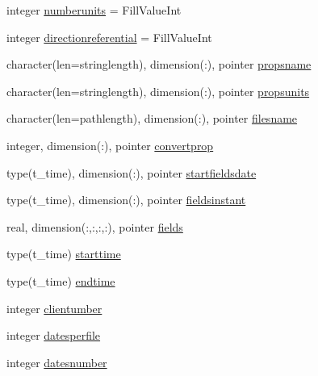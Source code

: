 \begin{DoxyCompactItemize}
\item 
integer \mbox{\hyperlink{structmodulegfsasciiwind_1_1t__gfsasciiwind_a647af2640607a85ca5ad4abdc1e829c6}{numberunits}} = Fill\+Value\+Int
\item 
integer \mbox{\hyperlink{structmodulegfsasciiwind_1_1t__gfsasciiwind_a1a4af61281f9aa8b72f4f747e35d1a46}{directionreferential}} = Fill\+Value\+Int
\item 
character(len=stringlength), dimension(\+:), pointer \mbox{\hyperlink{structmodulegfsasciiwind_1_1t__gfsasciiwind_a7d05c7a9057b2f370d8603bfcd718f51}{propsname}}
\item 
character(len=stringlength), dimension(\+:), pointer \mbox{\hyperlink{structmodulegfsasciiwind_1_1t__gfsasciiwind_a5761b1671bf051f52aaddc7c3b7463c3}{propsunits}}
\item 
character(len=pathlength), dimension(\+:), pointer \mbox{\hyperlink{structmodulegfsasciiwind_1_1t__gfsasciiwind_a4c88768c63596b6460b1382b7ef14d79}{filesname}}
\item 
integer, dimension(\+:), pointer \mbox{\hyperlink{structmodulegfsasciiwind_1_1t__gfsasciiwind_a14b1dcbd30dc506e93d917a67542ebd3}{convertprop}}
\item 
type(t\+\_\+time), dimension(\+:), pointer \mbox{\hyperlink{structmodulegfsasciiwind_1_1t__gfsasciiwind_a2eecde5054b0ade4965149f85bd6ed5e}{startfieldsdate}}
\item 
type(t\+\_\+time), dimension(\+:), pointer \mbox{\hyperlink{structmodulegfsasciiwind_1_1t__gfsasciiwind_ac61e5cee95a405d1c36ea100fc9e802e}{fieldsinstant}}
\item 
real, dimension(\+:,\+:,\+:,\+:), pointer \mbox{\hyperlink{structmodulegfsasciiwind_1_1t__gfsasciiwind_a87155773415d9e23052c72179106c8a4}{fields}}
\item 
type(t\+\_\+time) \mbox{\hyperlink{structmodulegfsasciiwind_1_1t__gfsasciiwind_a4460d0027ab532eeaca9a92962d77684}{starttime}}
\item 
type(t\+\_\+time) \mbox{\hyperlink{structmodulegfsasciiwind_1_1t__gfsasciiwind_a23e2b17ecebc9e227139edbbcb4f0ba4}{endtime}}
\item 
integer \mbox{\hyperlink{structmodulegfsasciiwind_1_1t__gfsasciiwind_a2f1f006eb7d6fd18b64cc2e529dbd43e}{clientumber}}
\item 
integer \mbox{\hyperlink{structmodulegfsasciiwind_1_1t__gfsasciiwind_a086b1057f3ab0ec3e7cf7ac34be283e9}{datesperfile}}
\item 
integer \mbox{\hyperlink{structmodulegfsasciiwind_1_1t__gfsasciiwind_ae75da242286dbd4db78c3368ab7be408}{datesnumber}}

\end{DoxyCompactItemize}
